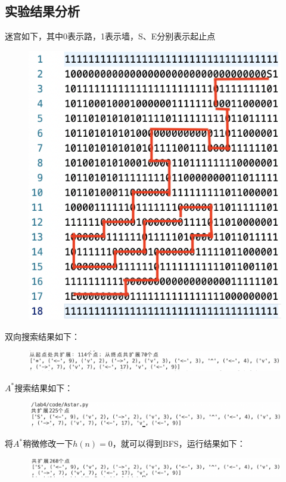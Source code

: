 \documentclass{article}
\begin{document}
\begin{CJK}{UTF8}{gbsn}
\section{实验结果分析}
	迷宫如下，其中0表示路，1表示墙，S、E分别表示起止点\\
	\begin{figure}[H]
		\centering
		\includegraphics[scale=0.8]{fig/2}
	\end{figure}

	双向搜索结果如下：\\
	\begin{figure}[H]
	\includegraphics[scale=0.8]{fig/1}	
	\end{figure}

	$A^*$搜索结果如下：
	\begin{figure}[H]
	\includegraphics[scale=0.8]{fig/3}
	\end{figure}
	
	将$A^*$稍微修改一下$h(n)=0$，就可以得到BFS，运行结果如下：
	\begin{figure}[H]
	\includegraphics[scale=0.8,trim=0 5 0 0, clip]{fig/4}	
	\end{figure}
	

\end{CJK}
\end{document}

